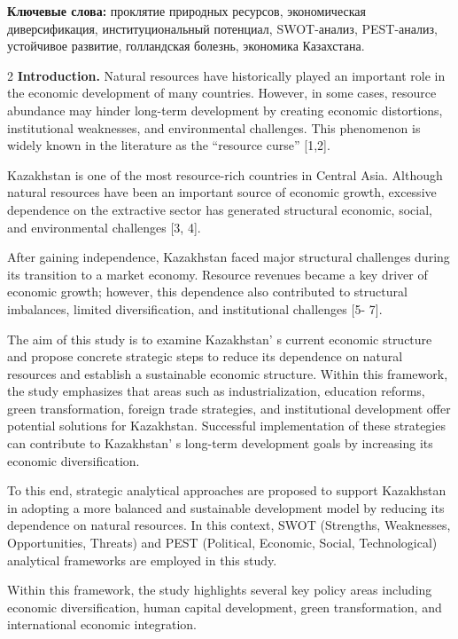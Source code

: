 {\bfseries Ключевые слова:} проклятие природных ресурсов, экономическая
диверсификация, институциональный потенциал, SWOT-анализ, PEST-анализ,
устойчивое развитие, голландская болезнь, экономика Казахстана.

\begin{multicols}{2}
{\bfseries Introduction.} Natural resources have historically played an
important role in the economic development of many countries. However,
in some cases, resource abundance may hinder long-term development by
creating economic distortions, institutional weaknesses, and
environmental challenges. This phenomenon is widely known in the
literature as the ``resource curse'' {[}1,2{]}.

Kazakhstan is one of the most resource-rich countries in Central Asia.
Although natural resources have been an important source of economic
growth, excessive dependence on the extractive sector has generated
structural economic, social, and environmental challenges {[}3, 4{]}.

After gaining independence, Kazakhstan faced major structural challenges
during its transition to a market economy. Resource revenues became a
key driver of economic growth; however, this dependence also contributed
to structural imbalances, limited diversification, and institutional
challenges {[}5- 7{]}.

The aim of this study is to examine Kazakhstan' s current
economic structure and propose concrete strategic steps to reduce its
dependence on natural resources and establish a sustainable economic
structure. Within this framework, the study emphasizes that areas such
as industrialization, education reforms, green transformation, foreign
trade strategies, and institutional development offer potential
solutions for Kazakhstan. Successful implementation of these strategies
can contribute to Kazakhstan' s long-term development
goals by increasing its economic diversification.

To this end, strategic analytical approaches are proposed to support
Kazakhstan in adopting a more balanced and sustainable development model
by reducing its dependence on natural resources. In this context, SWOT
(Strengths, Weaknesses, Opportunities, Threats) and PEST (Political,
Economic, Social, Technological) analytical frameworks are employed in
this study.

Within this framework, the study highlights several key policy areas
including economic diversification, human capital development, green
transformation, and international economic integration.


\end{multicols}
